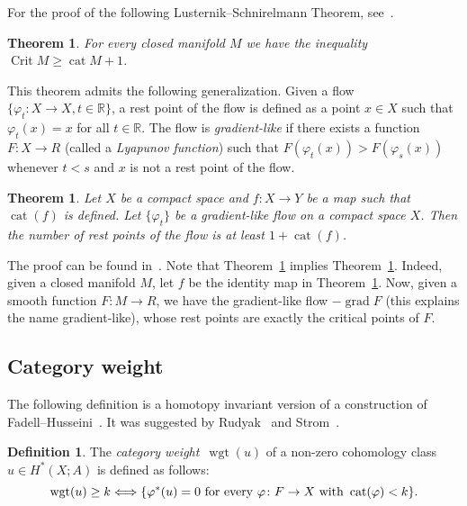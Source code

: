 \documentclass[12pt]{amsart}
\newcommand{\B}[1]{{\mathbb #1}}
\newcommand\R{\B R}
\newtheorem{theorem}[subsection]{Theorem}%
\newtheorem{thm}[subsection]{Theorem}
\numberwithin{equation}{section}
\theoremstyle{definition}
\newtheorem{definition}[subsection]{Definition}
\theoremstyle{remark}
\newcommand\theoref{Theorem~\ref}
\numberwithin{figure}{section}
\numberwithin{table}{section}
\newcommand{\gf}{{\varphi}}
\newcommand\cat{\operatorname{cat}}
\newcommand\wgt{\operatorname{wgt}}
\newcommand\grad{\operatorname{grad}}
\newcommand\Crit{\operatorname{Crit}}
\begin{document}
 
 
For the proof of the following Lusternik--Schnirelmann Theorem, see~\cite{CLOT}. 
 
\begin{theorem}\label{t:ls} 
For every closed manifold $M$ we have the inequality $\Crit M \ge \cat M+1$. 
\end{theorem} 
 
This theorem admits the following generalization. Given a flow  
$\{\gf_t: X \to X, t\in \R\}$,  
a rest point of the flow is defined as a point $x\in X$ such that $\gf_t(x)=x$  
for  
all $t\in \R$. The flow is {\it gradient-like} if there exists a function $F: X  
\to R$  
(called a {\it Lyapunov function}) such that  
$F(\gf_t(x))>F(\gf_s(x))$ whenever $t<s$ and $x$ is not a rest point of the 
flow. 
 
\begin{thm}\label{t:flow} 
Let $X$ be a compact space and $f: X \to Y$ be a map such that $\cat(f)$ is  
defined. Let $\{\gf_t\}$ be a gradient-like flow on a compact space $X$. Then  
the number of rest points of the flow is at least $1+\cat(f)$. 
\end{thm} 
 
The proof can be found in~\cite{CLOT}. Note that \theoref{t:flow} implies  
\theoref{t:ls}. Indeed, given a closed manifold $M$, let $f$  be the identity  
map in \theoref{t:flow}. Now, given a smooth function $F: M \to R$, we have the  
gradient-like flow $-\grad F$ (this explains the name gradient-like),  
whose rest points are exactly the critical points of $F$.    
 
\subsection{Category weight} 
The following definition is a homotopy invariant version of a construction of  
Fadell--Husseini~\cite{FH}. It was suggested by Rudyak~\cite{R1} and 
Strom~\cite{St}. 
 
 
\begin{definition}\label{def:swgt} 
The \emph{category weight}~$\wgt(u)$ of a non-zero cohomology class~$u \in 
H^*(X; A)$ is defined as follows: 
% 
\begin{equation*} 
\label{31} 
\wgt(u)\ge k \Longleftrightarrow \{\gf^*(u)=0 {\rm\ for\ every\ } \gf\colon F 
\to X 
{\rm\ with\ } \cat(\gf) < k\}. 
\end{equation*} 
% 
\end{definition} 
 
\end{document}
